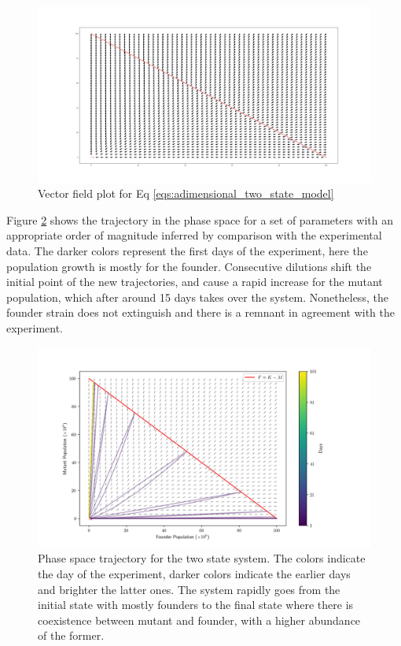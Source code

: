 \documentclass{article}
\begin{document}
\begin{figure}
    \centering
    \includegraphics[width=1\linewidth]{plots/vector_field.png}
    \caption{Vector field plot for Eq \ref{eqs:adimensional_two_state_model}}
    \label{fig:vector_field_2st}
\end{figure}

Figure \ref{fig:2st_vector_fiel_with_trajectory} shows the trajectory in the phase space for a set of parameters with an appropriate order of magnitude inferred by comparison with the experimental data. The darker colors represent the first days of the experiment, here the population growth is mostly for the founder. Consecutive dilutions shift the initial point of the new trajectories, and cause a rapid increase for the mutant population, which after around 15 days takes over the system. Nonetheless, the founder strain does not extinguish and there is a remnant in agreement with the experiment.

\begin{figure}[H]
    \centering
    \includegraphics[width=1\linewidth]{plots/vector field with trajectory.png}
    \caption{Phase space trajectory for the two state system. The colors indicate the day of the experiment, darker colors indicate the earlier days and brighter the latter ones. The system rapidly goes from the initial state with mostly founders to the final state where there is coexistence between mutant and founder, with a higher abundance of the former.}
    \label{fig:2st_vector_fiel_with_trajectory}
\end{figure}
\end{document}
